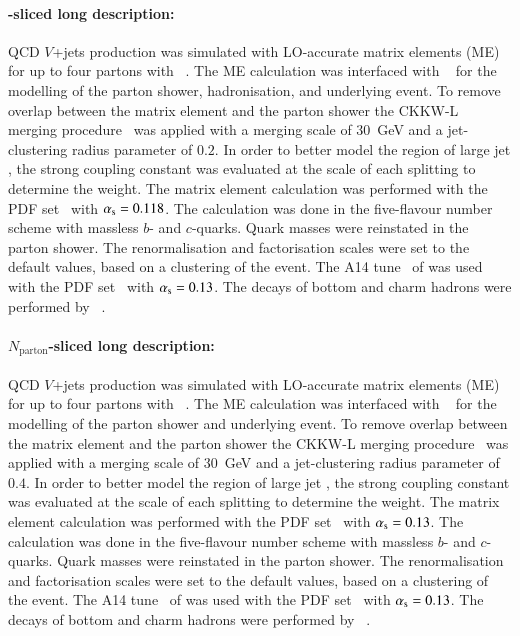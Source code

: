 \paragraph{\HT-sliced long description:}

QCD \(V\)+jets production was simulated with LO-accurate matrix elements (ME)
for up to four partons with \MGNLO[2.2.2]~\cite{Alwall:2014hca}. The ME calculation was interfaced with
\PYTHIA[8.186]~\cite{Sjostrand:2007gs} for the modelling of the parton
shower, hadronisation, and underlying event. To remove overlap between the matrix
element and the parton shower the CKKW-L merging
procedure~\cite{Lonnblad:2001iq,Lonnblad:2011xx} was applied with a
merging scale of \qty{30}{\GeV} and a jet-clustering radius parameter of
\(0.2\). In order to better model the region of large jet \pT, the
strong coupling constant \alphas was evaluated at the scale of each splitting to
determine the weight. The matrix element calculation was performed with
the \NNPDF[3.0nlo] PDF set~\cite{Ball:2014uwa} with \(\alpha_{\text{s}}= 0.118\). The calculation was done
in the five-flavour number scheme with massless \(b\)- and
\(c\)-quarks. Quark masses were reinstated in the \PYTHIA[8] parton shower.
The renormalisation and factorisation scales were set to the \MADGRAPH default
values, based on a clustering of the event. The A14
tune~\cite{ATL-PHYS-PUB-2014-021} of \PYTHIA[8] was used with the
\NNPDF[2.3lo] PDF set~\cite{Ball:2012cx} with \(\alpha_{\text{s}}=0.13\).
The decays of bottom and charm hadrons were performed by \EVTGEN[1.2.0]~\cite{Lange:2001uf}.


\paragraph{\(N_\text{parton}\)-sliced long description:}

QCD \(V\)+jets production was simulated with LO-accurate matrix elements (ME) for up to four partons with
\MGNLO[2.2.2]~\cite{Alwall:2014hca}. The ME calculation was interfaced
with \PYTHIA[8.186]~\cite{Sjostrand:2007gs} for the modelling of the parton
shower and underlying event. To remove overlap between the matrix
element and the parton shower the CKKW-L merging
procedure~\cite{Lonnblad:2001iq,Lonnblad:2011xx} was applied with a
merging scale of \qty{30}{\GeV} and a jet-clustering radius parameter of
\(0.4\). In order to better model the region of large jet \pT, the
strong coupling constant \alphas was evaluated at the scale of each splitting to
determine the weight. The matrix element calculation was performed with
the \NNPDF[2.3lo] PDF set~\cite{Ball:2012cx} with \(\alpha_{\text{s}}= 0.13\). The calculation was done
in the five-flavour number scheme with massless \(b\)- and
\(c\)-quarks. Quark masses were reinstated in the \PYTHIA[8] parton shower.
The renormalisation and factorisation scales were set to the \MADGRAPH default
values, based on a clustering of the event. The A14 tune~\cite{ATL-PHYS-PUB-2014-021}
of \PYTHIA[8] was used with the \NNPDF[2.3lo] PDF set~\cite{Ball:2012cx} with \(\alpha_{\text{s}}=0.13\).
The decays of bottom and charm hadrons were performed by \EVTGEN[1.2.0]~\cite{Lange:2001uf}.

